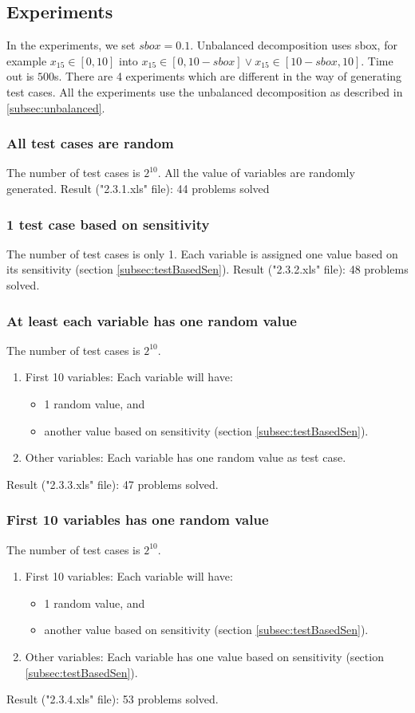\documentclass[12pt]{article}
\begin{document}
\subsection{Experiments}
In the experiments, we set $sbox=0.1$. Unbalanced decomposition uses sbox, for example $x_{15} \in [0, 10]$ into $x_{15} \in [0, 10-sbox] \lor x_{15} \in [10-sbox, 10]$. Time out is $500$s. There are 4 experiments which are different in the way of generating test cases. All the experiments use the unbalanced decomposition as described in \ref{subsec:unbalanced}. 

\subsubsection{All test cases are random}
The number of test cases is $2^{10}$.
All the value of variables are randomly generated.
Result ("2.3.1.xls" file): 44 problems solved

\subsubsection{1 test case based on sensitivity}
The number of test cases is only 1. Each variable is assigned one value based on its sensitivity (section \ref{subsec:testBasedSen}).
Result ("2.3.2.xls" file): 48 problems solved.

\subsubsection{At least each variable has one random value}
The number of test cases is $2^{10}$. 
\begin{enumerate}
  \item First 10 variables: Each variable will have:
  \begin{itemize}
    \item 1 random value, and
    \item another value based on sensitivity (section \ref{subsec:testBasedSen}).
  \end{itemize}
  \item Other variables: Each variable has one random value as test case.
\end{enumerate}
Result ("2.3.3.xls" file): 47 problems solved.

\subsubsection{First 10 variables has one random value}
The number of test cases is $2^{10}$. 
\begin{enumerate}
  \item First 10 variables: Each variable will have:
  \begin{itemize}
    \item 1 random value, and
    \item another value based on sensitivity (section \ref{subsec:testBasedSen}).
  \end{itemize}
  \item Other variables: Each variable has one value based on sensitivity (section \ref{subsec:testBasedSen}).
\end{enumerate}
Result ("2.3.4.xls" file): 53 problems solved.
\end{document}
